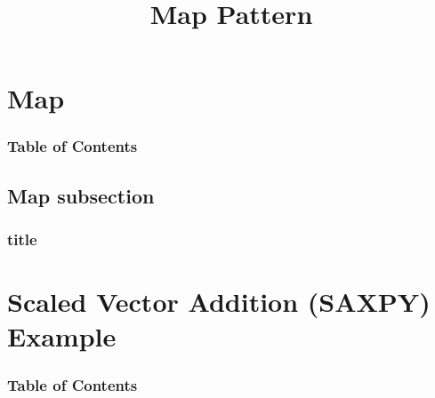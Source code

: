 \documentclass[xcolor=dvipsnames]{beamer}
\begin{document}
	\title[Map Pattern]{Map Pattern}
	\author[]{\className}
	\institute[\className]{\departmentName}
	\date{} 


	\begin{frame}
		\maketitle
	\end{frame}


\section{Map} 

	\begin{frame} \frametitle{Table of Contents}
		\tableofcontents[currentsection]
	\end{frame} 
	
	
	\subsection{Map subsection}
	
		\begin{frame} \frametitle{title}
	
		\end{frame}


\section{Scaled Vector Addition (SAXPY) Example} 

	\begin{frame} \frametitle{Table of Contents}
		\tableofcontents[currentsection]
	\end{frame} 
	
\end{document}
